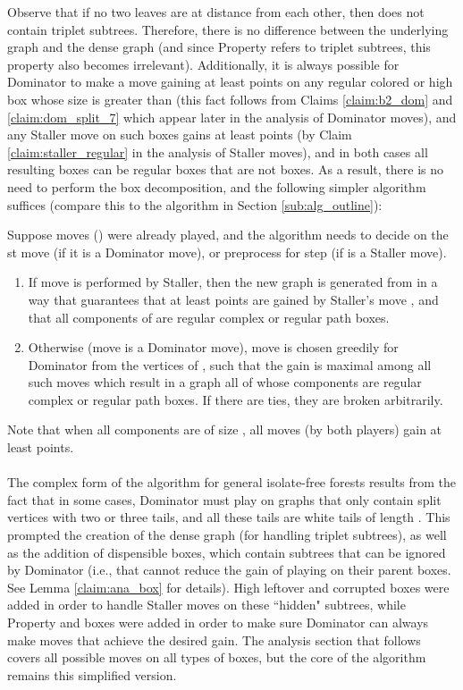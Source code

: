 \documentclass[11pt]{article}
\def\dnsitem{\vspace{-7pt}\item}
\theoremstyle{definition}
\begin{document}
Observe that if no two leaves are at distance  from each other, then  does not contain triplet subtrees.
Therefore, there is no difference between the underlying graph  and the dense graph  (and since Property  refers to triplet subtrees, this property also becomes irrelevant).
Additionally, it is always possible for Dominator to make a move gaining at least  points on any regular colored or high box whose size is greater than  (this fact follows from Claims \ref{claim:b2_dom} and \ref{claim:dom_split_7} which appear later in the analysis of Dominator moves), and any Staller move on such boxes gains at least  points (by Claim \ref{claim:staller_regular} in the analysis of Staller moves),
and in both cases all resulting boxes can be regular boxes that are not  boxes.
As a result, there is no need to perform the box decomposition, and the following simpler algorithm suffices (compare this to the algorithm in Section \ref{sub:alg_outline}):

Suppose  moves () were already played, and the algorithm needs to decide on the st move (if it is a Dominator move), or preprocess for step  (if  is a Staller move).
\begin{enumerate}
	\dnsitem If move  is performed by Staller, then the new graph  is generated from  in a way that guarantees that at least  points are gained 
	by Staller's move , 
	and that all components of  are regular complex or regular path boxes.

	\dnsitem 
	Otherwise (move  is a Dominator move),
	move  is chosen greedily for Dominator from the vertices of ,
	such that the gain is maximal among all such moves which result in a graph  all of whose components are regular complex or regular path boxes. 
	If there are ties, they are broken arbitrarily.	
\end{enumerate}
Note that when all components are of size , all moves (by both players) gain at least  points.

\paragraph{}
The complex form of the algorithm for general isolate-free forests results from the fact that in some cases, Dominator must play on graphs that only contain split vertices with two or three tails, and all these tails are white tails of length . 
This prompted the creation of the dense graph (for handling triplet subtrees), as well as the addition of dispensible boxes, which contain subtrees that can be ignored by Dominator (i.e., that cannot reduce the gain of playing on their parent boxes. See Lemma \ref{claim:ana_box} for details). 
High leftover and corrupted boxes were added in order to handle Staller moves on these ``hidden" subtrees, while Property  and  boxes were added in order to make sure Dominator can always make moves that achieve the desired gain.
The analysis section that follows covers all possible moves on all types of boxes, but the core of the algorithm remains this simplified version.
\end{document}
